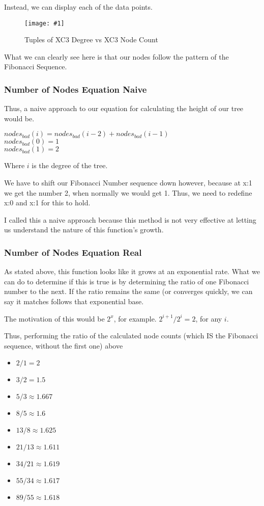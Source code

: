 \documentclass{article}
\newcommand{\figureInsetScaled}[3]
{
    \FloatBarrier{}
    \figureRaw{#1}{#2}{#3}
    \FloatBarrier{}
}
\newcommand{\figureRaw}[3]
{
    \begin{figure}[ht!]
        \centering
        \texttt{[image: \#1]}
        \caption{#2}
    \end{figure}
}
\begin{document}
Instead, we can display each of the data points.

\figureInsetScaled{images/experiment4/points.png}{Tuples of XC3 Degree vs XC3 Node Count}{0.65}

What we can clearly see here is that our nodes follow the pattern of the Fibonacci Sequence.


\subsubsection{Number of Nodes Equation Naive}

Thus, a naive approach to our equation for calculating the height of our tree would be.
\\
{
\Large
\begin{center}
    $nodes_{bad}(i) = nodes_{bad}(i-2) + nodes_{bad}(i-1)$\\
    $ $\\
    $nodes_{bad}(0) = 1$\\
    $nodes_{bad}(1) = 2$\\
    $ $
\end{center}
}
Where $i$ is the degree of the tree.

We have to shift our Fibonacci Number sequence down however, because at x:1 we get the number 2, when normally we would get 1. Thus, we need to redefine x:0 and x:1 for this to hold.

I called this a naive approach because this method is not very effective at letting us understand the nature of this function's growth.

\subsubsection{Number of Nodes Equation Real}

As stated above, this function looks like it grows at an exponential rate. What we can do to determine if this is true is by determining the ratio of one Fibonacci number to the next. If the ratio remains the same (or converges quickly, we can say it matches follows that exponential base.

The motivation of this would be $2^x$, for example. $2^{i+1} / 2^{i} = 2$, for any $i$.

Thus, performing the ratio of the calculated node counts (which IS the Fibonacci sequence, without the first one) above

\begin{itemize}
    \item $2 / 1 = 2$
    \item $3 / 2 = 1.5$
    \item $5 / 3 \approx 1.667$
    \item $8 / 5 \approx 1.6$
    \item $13 / 8 \approx 1.625$
    \item $21 / 13 \approx 1.611$
    \item $34 / 21 \approx 1.619$
    \item $55 / 34 \approx 1.617$
    \item $89 / 55 \approx 1.618$
\end{itemize}
\end{document}

